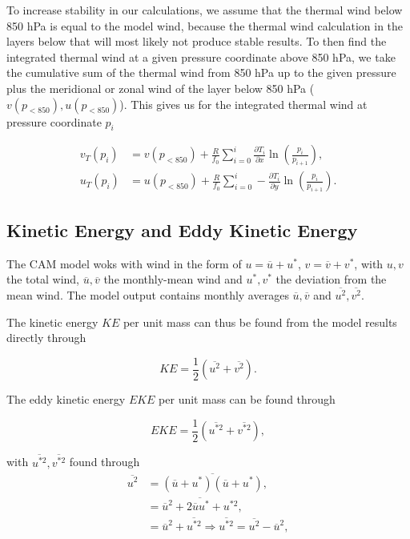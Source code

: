 To increase stability in our calculations, we assume that the thermal wind below 850 hPa is equal to the model wind, because the thermal wind calculation in the layers below that will most likely not produce stable results. To then find the integrated thermal wind at a given pressure coordinate above 850 hPa, we take the cumulative sum of the thermal wind from 850 hPa up to the given pressure plus the meridional or zonal wind of the layer below 850 hPa ($v(p_{<850}),u(p_{<850})$). This gives us for the integrated thermal wind at pressure coordinate $p_i$ 

\begin{equation}
    \begin{split}
        v_{T}(p_i) &= v(p_{<850}) + \frac{R}{f_0} \sum_{i=0}^{i} \frac{\partial T_i}{\partial x} \ln \left(\frac{p_i}{p_{i+1}}\right),\\
        u_{T}(p_i) &= u(p_{<850}) + \frac{R}{f_0} \sum_{i=0}^{i} - \frac{\partial T_i}{\partial y} \ln \left(\frac{p_i}{p_{i+1}}\right).
    \end{split}
\end{equation}


\subsection{Kinetic Energy and Eddy Kinetic Energy}
The CAM model woks with wind in the form of $u = \overline{u} + u^{\ast}$, $v = \overline{v} + v^{\ast}$, with $u,v$ the total wind, $\overline{u},\overline{v}$ the monthly-mean wind and $u^\ast,v^\ast$ the deviation from the mean wind. The model output contains monthly averages $\overline{u},\overline{v}$ and $\overline{u^2},\overline{v^2}$. %

The kinetic energy $KE$ per unit mass can thus be found from the model results directly through

\begin{equation}\label{eq:KE}
    KE = \frac{1}{2} \left( \overline{u^2} + \overline{v^2} \right).
\end{equation}

The eddy kinetic energy $EKE$ per unit mass can be found through 

\begin{equation}\label{eq:EKE}
    EKE = \frac{1}{2} \left( \overline{u^{\ast 2}} + \overline{v^{\ast 2}} \right),
\end{equation}

\noindent with $\overline{u^{\ast 2}}, \overline{v^{\ast 2}}$ found through
\begin{equation}
    \begin{split}
        \overline{u^2} &= \overline{\left( \overline{u} + u^\ast \right) \left( \overline{u} + u^\ast \right)},\\
        &= \overline{\overline{u}^2 + 2 \overline{u}u^\ast + u^{\ast 2}},\\
        &= \overline{u}^2 + \overline{u^{\ast 2}} \Rightarrow \overline{u^{\ast 2}} = \overline{u^2} - \overline{u}^2, 
    \end{split}
\end{equation}


